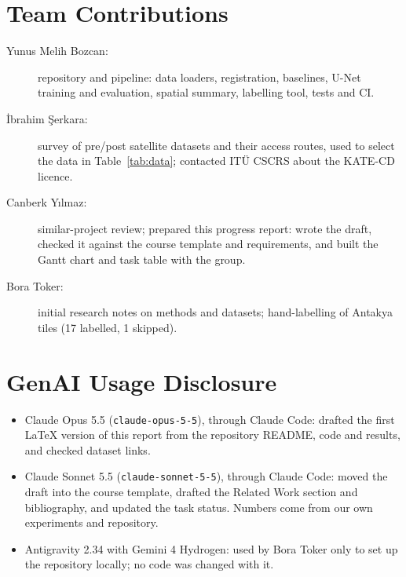 \documentclass[14pt]{article}
\begin{document}
\section{Team Contributions}
\begin{description}
    \item[Yunus Melih Bozcan:] repository and pipeline: data loaders, registration, baselines, U-Net training and evaluation, spatial summary, labelling tool, tests and CI.
    \item[\.{I}brahim \c{S}erkara:] survey of pre/post satellite datasets and their access routes, used to select the data in Table~\ref{tab:data}; contacted ITÜ CSCRS about the KATE-CD licence.
    \item[Canberk Y{\i}lmaz:] similar-project review; prepared this progress report: wrote the draft, checked it against the course template and requirements, and built the Gantt chart and task table with the group.
    \item[Bora Toker:] initial research notes on methods and datasets; hand-labelling of Antakya tiles (17 labelled, 1 skipped).
\end{description}

\section*{GenAI Usage Disclosure}
\begin{itemize}
    \item Claude Opus 5.5 (\texttt{claude-opus-5-5}), through Claude Code: drafted the first LaTeX version of this report from the repository README, code and results, and checked dataset links.
    \item Claude Sonnet 5.5 (\texttt{claude-sonnet-5-5}), through Claude Code: moved the draft into the course template, drafted the Related Work section and bibliography, and updated the task status. Numbers come from our own experiments and repository.
    \item Antigravity 2.34 with Gemini 4 Hydrogen: used by Bora Toker only to set up the repository locally; no code was changed with it.
\end{itemize}

\setlength{\bibsep}{2pt}


\end{document}
